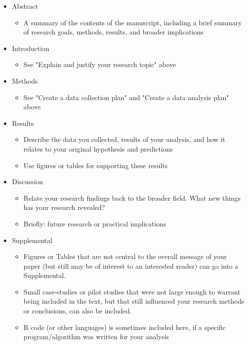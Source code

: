 \documentclass[11pt]{article}
\begin{document}
\begin{itemize}
\item Abstract
\begin{itemize}
  \item A summary of the contents of the manuscript, including a brief summary of research goals, methods, results, and broader implications
\end{itemize}
\item Introduction
\begin{itemize}
  \item See "Explain and justify your research topic" above
\end{itemize}
\item Methods
\begin{itemize}
  \item See "Create a data collection plan" and "Create a data analysis plan" above
\end{itemize}
\item Results
\begin{itemize}
  \item Describe the data you collected, results of your analysis, and how it relates to your original hypothesis and predictions 
  \item Use figures or tables for supporting these results
\end{itemize}
\item Discussion
\begin{itemize}
  \item Relate your research findings back to the broader field. What new things has your research revealed?
  \item Briefly: future research or practical implications
\end{itemize}
\item Supplemental
\begin{itemize}
  \item Figures or Tables that are not central to the overall message of your paper (but still may be of interest to an interested reader) can go into a Supplemental.
  \item Small case-studies or pilot studies that were not large enough to warrant being included in the text, but that still influenced your research methods or conclusions, can also be included.
  \item R code (or other languages) is sometimes included here, if a specific program/algorithm was written for your analysis
\end{itemize}
\end{itemize}
\end{document}
